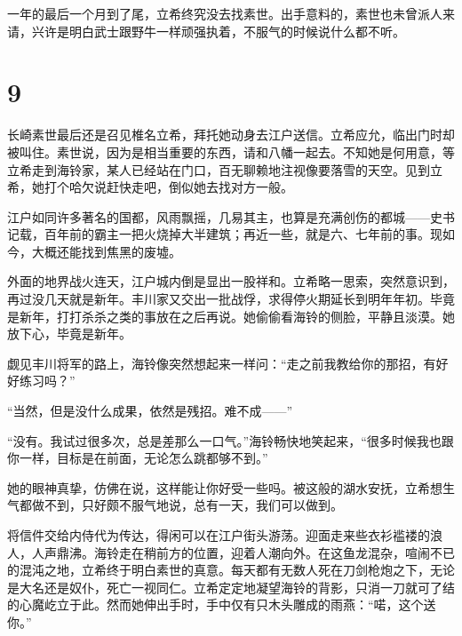 \documentclass{article}
\begin{document}
一年的最后一个月到了尾，立希终究没去找素世。出手意料的，素世也未曾派人来请，兴许是明白武士跟野牛一样顽强执着，不服气的时候说什么都不听。





{\centering\section*{9}}





长崎素世最后还是召见椎名立希，拜托她动身去江户送信。立希应允，临出门时却被叫住。素世说，因为是相当重要的东西，请和八幡一起去。不知她是何用意，等立希走到海铃家，某人已经站在门口，百无聊赖地注视像要落雪的天空。见到立希，她打个哈欠说赶快走吧，倒似她去找对方一般。



江户如同许多著名的国都，风雨飘摇，几易其主，也算是充满创伤的都城——史书记载，百年前的霸主一把火烧掉大半建筑；再近一些，就是六、七年前的事。现如今，大概还能找到焦黑的废墟。



外面的地界战火连天，江户城内倒是显出一股祥和。立希略一思索，突然意识到，再过没几天就是新年。丰川家又交出一批战俘，求得停火期延长到明年年初。毕竟是新年，打打杀杀之类的事放在之后再说。她偷偷看海铃的侧脸，平静且淡漠。她放下心，毕竟是新年。



觑见丰川将军的路上，海铃像突然想起来一样问：“走之前我教给你的那招，有好好练习吗？”



“当然，但是没什么成果，依然是残招。难不成——”



“没有。我试过很多次，总是差那么一口气。”海铃畅快地笑起来，“很多时候我也跟你一样，目标是在前面，无论怎么跳都够不到。”



她的眼神真挚，仿佛在说，这样能让你好受一些吗。被这般的湖水安抚，立希想生气都做不到，只好颇不服气地说，总有一天，我们可以做到。



将信件交给内侍代为传达，得闲可以在江户街头游荡。迎面走来些衣衫褴褛的浪人，人声鼎沸。海铃走在稍前方的位置，迎着人潮向外。在这鱼龙混杂，喧闹不已的混沌之地，立希终于明白素世的真意。每天都有无数人死在刀剑枪炮之下，无论是大名还是奴仆，死亡一视同仁。立希定定地凝望海铃的背影，只消一刀就可了结的心魔屹立于此。然而她伸出手时，手中仅有只木头雕成的雨燕：“喏，这个送你。”
\end{document}
